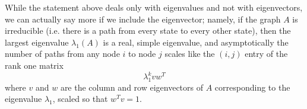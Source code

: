 \documentclass[12pt, leqno]{article} %
\begin{document}
While the statement above deals only with eigenvalues and not with
eigenvectors, we can actually say more if we include the eigenvector;
namely, if the graph $A$ is irreducible (i.e. there is a path from
every state to every other state), then the largest eigenvalue
$\lambda_1(A)$ is a real, simple eigenvalue, and asymptotically the number
of paths from any node $i$ to node $j$ scales like the $(i,j)$ entry
of the rank one matrix
\[
  \lambda_1^k v w^T
\]
where $v$ and $w$ are the column and row eigenvectors of $A$
corresponding to the eigenvalue $\lambda_1$, scaled so that $w^T v = 1$.
\end{document}
